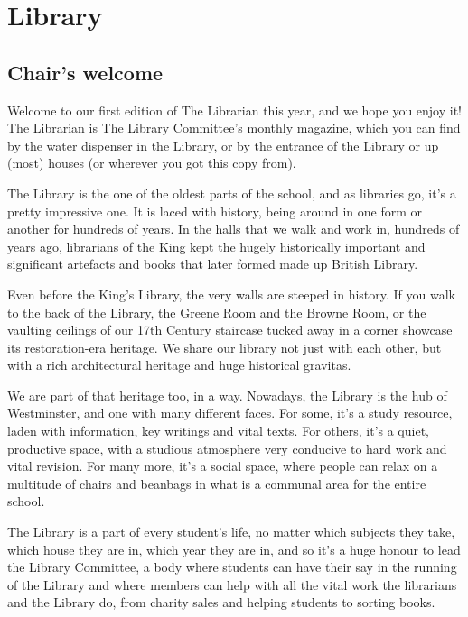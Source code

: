 \documentclass[12pt,a4paper]{report}
\begin{document}


\chapter{Library}

\section{Chair's welcome}

\begin{multicols}{2}
Welcome to our first edition of The Librarian this year, and we hope you enjoy it! The Librarian is The Library Committee’s monthly magazine, which you can find by the water dispenser in the Library, or by the entrance of the Library or up (most) houses (or wherever you got this copy from).

The Library is the one of the oldest parts of the school, and as libraries go, it’s a pretty impressive one. It is laced with history, being around in one form or another for hundreds of years. In the halls that we walk and work in, hundreds of years ago, librarians of the King kept the hugely historically important and significant artefacts and books that later formed made up British Library.

Even before the King’s Library, the very walls are steeped in history. If you walk to the back of the Library, the Greene Room and the Browne Room, or the vaulting ceilings of our 17th Century staircase tucked away in a corner showcase its restoration-era heritage. We share our library not just with each other, but with a rich architectural heritage and huge historical gravitas.

We are part of that heritage too, in a way. Nowadays, the Library is the hub of Westminster, and one with many different faces. For some, it’s a study resource, laden with information, key writings and vital texts. For others, it’s a quiet, productive space, with a studious atmosphere very conducive to hard work and vital revision. For many more, it’s a social space, where people can relax on a multitude of chairs and beanbags in what is a communal area for the entire school.

The Library is a part of every student’s life, no matter which subjects they take, which house they are in, which year they are in, and so it’s a huge honour to lead the Library Committee, a body where students can have their say in the running of the Library and where members can help with all the vital work the librarians and the Library do, from charity sales and helping students to sorting books.


\end{multicols}
\end{document}
